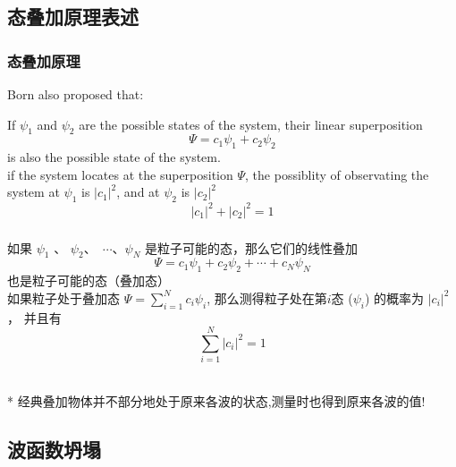  \subsection{态叠加原理表述}
 
 \begin{frame}
     \frametitle{态叠加原理}
     Born also proposed that: \\
     \begin{tcolorbox4}
     If $\psi_1$ and $\psi_2$ are the possible states of the system,
     their linear superposition \[ \Psi=c_1 \psi_1+ c_2\psi_2 \]
     is also the possible state of the system.\\
     if the system locates at the superposition $\Psi$, the possiblity of observating the system at $\psi_1$ is $|c_1|^2$, and at $\psi_2$ is $|c_2|^2$ \\
     \[|c_1 |^2 + |c_2 |^2 =1\]
     \end{tcolorbox4}
 \end{frame}
 
 \begin{frame}
     \frametitle{}
     \begin{tcolorbox4}[态叠加原理中文表述]
     如果 $\psi_1$ 、 $\psi_2$、 $\cdots$、$\psi_N$ 是粒子可能的态，那么它们的线性叠加
         $$ \Psi=c_1 \psi_1+ c_2\psi_2+\cdots+c_N\psi_N $$
     也是粒子可能的态（叠加态）\\   
     如果粒子处于叠加态 $\Psi=\sum\limits_{i=1}^N c_i \psi_i$,  
     那么测得粒子处在第$i$态 ($\psi_i$) 的概率为 $|c_i |^2$， 
     并且有  $$\sum_{i=1}^{N} |c_i|^2 =1$$
     \end{tcolorbox4}
     ~~\\ 
     * 经典叠加物体并不部分地处于原来各波的状态,测量时也得到原来各波的值!
 \end{frame}
 
 \subsection{波函数坍塌}
 
